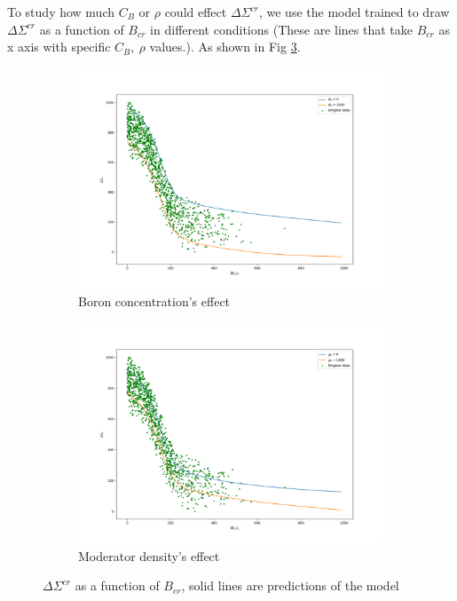 To study how much $C_B$ or $\rho$ could effect $\Delta\Sigma^{cr}$,
we use the model trained to draw $\Delta\Sigma^{cr}$ as a function of $B_{cr}$ in different conditions
(These are lines that take $B_{cr}$ as x axis with specific $C_B,\:\rho$ values.).
As shown in Fig \ref{fig:Bwdmaxmin}.
\begin{figure}[!htb]
    \centering
    \begin{subfigure}[b]{.475\textwidth}
        \centering
        \includegraphics[width=\textwidth]{Figs/DBcr0n_Bcr_difB_DNN.png}
        \caption{Boron concentration's effect}
        \label{fig:EdiffB}
    \end{subfigure}%
    \hfill
    \begin{subfigure}[b]{.475\textwidth}
        \centering
        \includegraphics[width=\textwidth]{Figs/DBcr0n_Bcr_difwd_DNN.png}
        \caption{Moderator density's effect}
        \label{fig:Ediffwd}
    \end{subfigure}
    \caption{$\Delta\Sigma^{cr}$ as a function of $B_{cr}$, solid lines are predictions of the model}
    \label{fig:Bwdmaxmin}
\end{figure}

